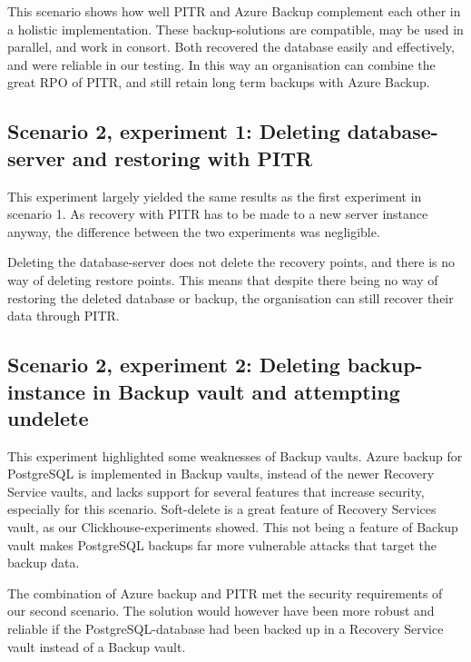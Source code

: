 This scenario shows how well PITR and Azure Backup complement each other in a holistic implementation. These backup-solutions are compatible, may be used in parallel, and work in consort. Both recovered the database easily and effectively, and were reliable in our testing. In this way an organisation can combine the great RPO of PITR, and still retain long term backups with Azure Backup.

\subsection{Scenario 2, experiment 1: Deleting database-server and restoring with PITR}
This experiment largely yielded the same results as the first experiment in scenario 1. As recovery with PITR has to be made to a new server instance anyway, the difference between the two experiments was negligible. 

Deleting the database-server does not delete the recovery points, and there is no way of deleting restore points. This means that despite there being no way of restoring the deleted database or backup, the organisation can still recover their data through PITR.

\subsection{Scenario 2, experiment 2: Deleting backup-instance in Backup vault and attempting undelete}
This experiment highlighted some weaknesses of Backup vaults. Azure backup for PostgreSQL is implemented in Backup vaults, instead of the newer Recovery Service vaults, and lacks support for several features that increase security, especially for this scenario.  Soft-delete is a great feature of Recovery Services vault, as our Clickhouse-experiments showed. This not being a feature of Backup vault makes PostgreSQL backups far more vulnerable attacks that target the backup data.

The combination of Azure backup and PITR met the security requirements of our second scenario. The solution would however have been more robust and reliable if the PostgreSQL-database had been backed up in a Recovery Service vault instead of a Backup vault.


